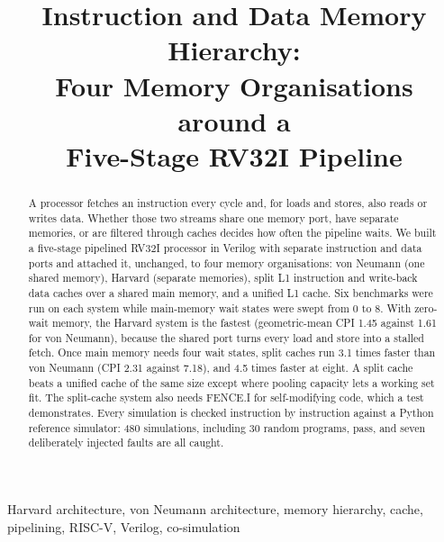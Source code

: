 \documentclass[conference]{IEEEtran}
\begin{document}
\title{Instruction and Data Memory Hierarchy:\\Four Memory Organisations around a\\Five-Stage RV32I Pipeline}

\author{
}

\maketitle

\begin{abstract}
A processor fetches an instruction every cycle and, for loads and stores, also reads or writes data. Whether those two streams share one memory port, have separate memories, or are filtered through caches decides how often the pipeline waits. We built a five-stage pipelined RV32I processor in Verilog with separate instruction and data ports and attached it, unchanged, to four memory organisations: von Neumann (one shared memory), Harvard (separate memories), split L1 instruction and write-back data caches over a shared main memory, and a unified L1 cache. Six benchmarks were run on each system while main-memory wait states were swept from 0 to 8. With zero-wait memory, the Harvard system is the fastest (geometric-mean CPI 1.45 against 1.61 for von Neumann), because the shared port turns every load and store into a stalled fetch. Once main memory needs four wait states, split caches run 3.1 times faster than von Neumann (CPI 2.31 against 7.18), and 4.5 times faster at eight. A split cache beats a unified cache of the same size except where pooling capacity lets a working set fit. The split-cache system also needs FENCE.I for self-modifying code, which a test demonstrates. Every simulation is checked instruction by instruction against a Python reference simulator: 480 simulations, including 30 random programs, pass, and seven deliberately injected faults are all caught.
\end{abstract}

\begin{IEEEkeywords}
Harvard architecture, von Neumann architecture, memory hierarchy, cache, pipelining, RISC-V, Verilog, co-simulation
\end{IEEEkeywords}
\end{document}
